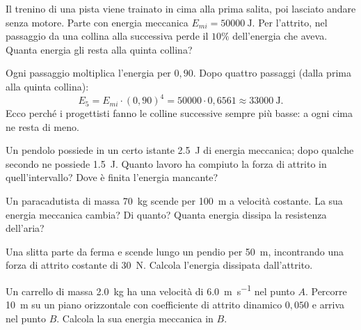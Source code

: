 \begin{testexample}
Il trenino di una pista viene trainato in cima alla prima salita, poi lasciato andare senza motore. Parte con energia meccanica $E_{mi} = \SI{50000}{\joule}$. Per l'attrito, nel passaggio da una collina alla successiva perde il $10\%$ dell'energia che aveva. Quanta energia gli resta alla quinta collina?

Ogni passaggio moltiplica l'energia per $0{,}90$. Dopo quattro passaggi (dalla prima alla quinta collina):
\[ E_5 = E_{mi} \cdot (0{,}90)^4 = 50000 \cdot 0{,}6561 \approx \SI{33000}{\joule}. \]
Ecco perché i progettisti fanno le colline successive sempre più basse: a ogni cima ne resta di meno.
\end{testexample}

\begin{esercizio}
Un pendolo possiede in un certo istante \SI{2,5}{\joule} di energia meccanica; dopo qualche secondo ne possiede \SI{1,5}{\joule}. Quanto lavoro ha compiuto la forza di attrito in quell'intervallo? Dove è finita l'energia mancante?\\
\end{esercizio}

\begin{esercizio}
Un paracadutista di massa \SI{70}{\kilo\gram} scende per \SI{100}{\metre} a velocità costante. La sua energia meccanica cambia? Di quanto? Quanta energia dissipa la resistenza dell'aria?\\
\end{esercizio}

\begin{esercizio}
Una slitta parte da ferma e scende lungo un pendio per \SI{50}{\metre}, incontrando una forza di attrito costante di \SI{30}{\newton}. Calcola l'energia dissipata dall'attrito.\\
\end{esercizio}

\begin{esercizio}
Un carrello di massa \SI{2,0}{\kilo\gram} ha una velocità di \SI{6,0}{\metre\per\second} nel punto $A$. Percorre \SI{10}{\metre} su un piano orizzontale con coefficiente di attrito dinamico $0{,}050$ e arriva nel punto $B$. Calcola la sua energia meccanica in $B$.\\
\end{esercizio}

